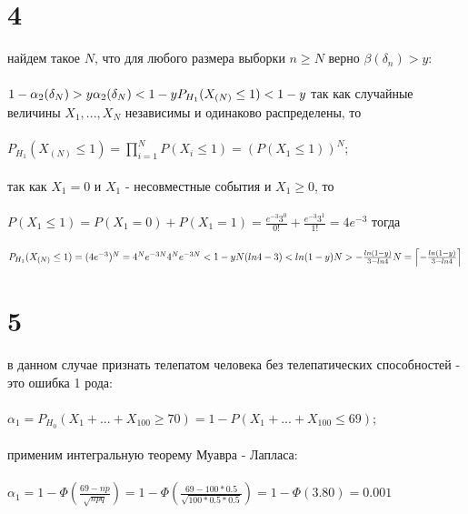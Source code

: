 \documentclass{article}
\begin{document}
\begin{large}
	\section*{4}
	найдем такое $N$, что для любого размера выборки $n\ge N$ верно $\beta(\delta_n)>y$:\\\\
	$
	1-\alpha_2(\delta_N)>y\\\\
	\alpha_2(\delta_N)<1-y\\\\
	P_{H_1}(X_{(N)}\le 1)<1-y\\\\
	$
	так как случайные величины $X_1,...,X_N$ независимы и одинаково распределены, то\\\\
	$P_{H_1}(X_{(N)}\le 1)=\prod_{i=1}^{N}P(X_i\le 1)=(P(X_1\le 1))^N$;\\\\
	так как $X_1=0$ и $X_1$ - несовместные события и $X_1\ge 0$, то\\\\
	$P(X_1\le 1)=P(X_1=0)+P(X_1=1)=\frac{e^{-3}3^0}{0!}+\frac{e^{-3}3^1}{1!}=4e^{-3}$
	тогда\\\\
	$
	P_{H_1}(X_{(N)}\le 1)=(4e^{-3})^N=4^Ne^{-3N}\\\\
	4^Ne^{-3N}<1-y\\\\
	N(ln4-3)<ln(1-y)\\\\
	N>-\frac{ln(1-y)}{3-ln4}\\\\
	N=\left \lceil{-\frac{ln(1-y)}{3-ln4}}\right \rceil\\\\
	$
	\section*{5}
	в данном случае признать телепатом человека без телепатических способностей - это ошибка 1 рода:\\\\
	$\alpha_1=P_{H_0}(X_1+...+X_{100}\ge 70)=1-P(X_1+...+X_{100}\le 69)$;\\\\
	применим интегральную теорему Муавра - Лапласа:\\\\
	$
	\alpha_1=1-\Phi(\frac{69-np}{\sqrt{npq}})=1-\Phi(\frac{69-100*0.5}{\sqrt{100*0.5*0.5}})=1-\Phi(3.80)=0.001
	$
	\end{large}
\end{document}
